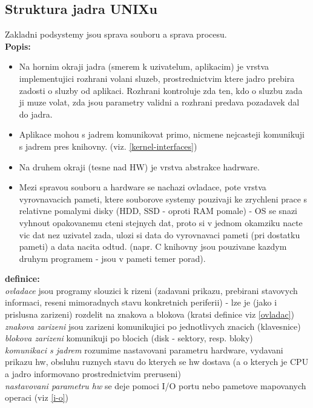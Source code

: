 \documentclass[a4paper, 11pt]{article}
\begin{document}
\subsection{Struktura jadra UNIXu}
Zakladni podsystemy jsou sprava souboru a sprava procesu. \\
\textbf{Popis:}
\begin{itemize}
    \item Na hornim okraji jadra (smerem k uzivatelum, aplikacim) je vrstva implementujici rozhrani volani sluzeb, prostrednictvim ktere jadro prebira zadosti o sluzby od aplikaci. Rozhrani kontroluje zda ten, kdo o sluzbu zada ji muze volat, zda jsou parametry validni a rozhrani predava pozadavek dal do jadra.
    \item Aplikace mohou s jadrem komunikovat primo, nicmene nejcasteji komunikuji s jadrem pres knihovny. (viz. \ref{kernel-interfaces})
    \item Na druhem okraji (tesne nad HW) je vrstva abstrakce hadrware.
    \item Mezi spravou souboru a hardware se nachazi ovladace, pote vrstva vyrovnavacich pameti, ktere souborove systemy pouzivaji ke zrychleni prace s relativne pomalymi disky (HDD, SSD - oproti RAM pomale) - OS se snazi vyhnout opakovanemu cteni stejnych dat, proto si v jednom okamziku nacte vic dat nez uzivatel zada, ulozi si data do vyrovnavaci pameti (pri dostatku pameti) a data nacita odtud. (napr. C knihovny jsou pouzivane kazdym druhym programem - jsou v pameti temer porad). \\
\end{itemize}

\noindent\textbf{definice:} \\[0.5em] \label{ovladace}
\textit{ovladace} jsou programy slouzici k rizeni (zadavani prikazu, prebirani stavovych informaci, reseni mimoradnych stavu konkretnich periferii) - lze je (jako i prislusna zarizeni) rozdelit na znakova a blokova (kratsi definice viz \ref{ovladac}) \\[0.2em]
\textit{znakova zarizeni} jsou zarizeni komunikujici po jednotlivych znacich (klavesnice) \\[0.2em]
\textit{blokova zarizeni} komunikuji po blocich (disk - sektory, resp. bloky) \\[0.2em]
\textit{komunikaci s jadrem} rozumime nastavovani parametru hardware, vydavani prikazu hw, obsluhu ruznych stavu do kterych se hw dostava (a o kterych je CPU a jadro informovano prostrednictvim preruseni) \\[0.2em]
\textit{nastavovani parametru hw} se deje pomoci I/O portu nebo pametove mapovanych operaci (viz \ref{i-o}) \\[0.2em]
\end{document}

